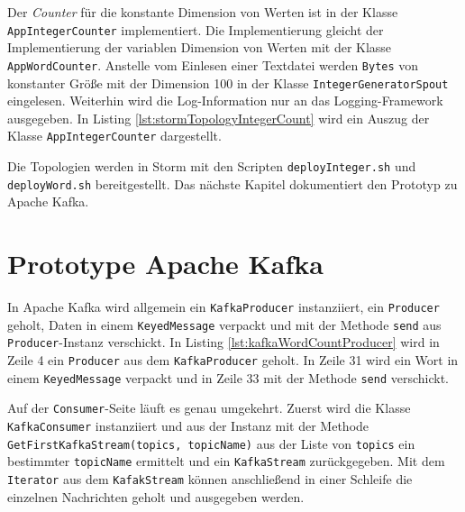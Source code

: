 

Der \textit{Counter} für die konstante Dimension von Werten ist in der Klasse \texttt{AppIntegerCounter} implementiert. Die Implementierung gleicht der Implementierung der variablen Dimension von Werten mit der Klasse \texttt{AppWordCounter}. Anstelle vom Einlesen einer Textdatei werden \texttt{Bytes} von konstanter Größe mit der Dimension 100 in der Klasse \texttt{IntegerGeneratorSpout} eingelesen. Weiterhin wird die Log-Information nur an das Logging-Framework ausgegeben. In Listing \ref{lst:stormTopologyIntegerCount} wird ein Auszug der Klasse \texttt{AppIntegerCounter} dargestellt.



Die Topologien werden in Storm mit den Scripten \texttt{deployInteger.sh} und \texttt{deployWord.sh} bereitgestellt. Das nächste Kapitel dokumentiert den Prototyp zu Apache Kafka.


\section{Prototype Apache Kafka}
\label{sec:prot:kafka}

In Apache Kafka wird allgemein ein \texttt{KafkaProducer} instanziiert, ein \texttt{Producer} geholt, Daten in einem \texttt{KeyedMessage} verpackt und mit der Methode \texttt{send} aus \texttt{Producer}-Instanz verschickt. In Listing \ref{lst:kafkaWordCountProducer} wird in Zeile 4 ein \texttt{Producer} aus dem \texttt{KafkaProducer} geholt. In Zeile 31 wird ein Wort in einem \texttt{KeyedMessage} verpackt und in Zeile 33 mit der Methode \texttt{send} verschickt.



Auf der \texttt{Consumer}-Seite läuft es genau umgekehrt. Zuerst wird die Klasse \texttt{KafkaConsumer} instanziiert und aus der Instanz mit der Methode \texttt{GetFirstKafkaStream(topics, topicName)} aus der Liste von \texttt{topics} ein bestimmter \texttt{topicName} ermittelt und ein \texttt{KafkaStream} zurückgegeben. Mit dem \texttt{Iterator} aus dem \texttt{KafakStream} können anschließend in einer Schleife die einzelnen Nachrichten geholt und ausgegeben werden.

